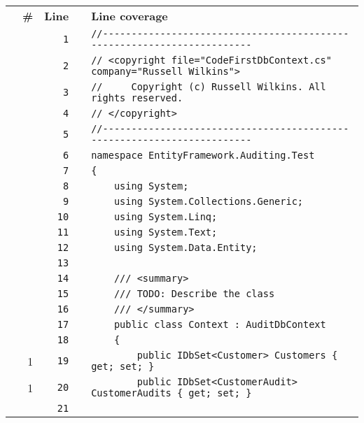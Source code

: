 \documentclass[a4paper,10pt]{article}
\begin{document}
\begin{longtable}[l]{lrrll}
\textbf{} & \textbf{\#} & \textbf{Line} & \textbf{} & \textbf{Line coverage}\\
\cellcolor{gray} &  & \verb~1~ & & \verb~//-----------------------------------------------------------------------~\\
\cellcolor{gray} &  & \verb~2~ & & \verb~// <copyright file="CodeFirstDbContext.cs" company="Russell Wilkins">~\\
\cellcolor{gray} &  & \verb~3~ & & \verb~//     Copyright (c) Russell Wilkins. All rights reserved.~\\
\cellcolor{gray} &  & \verb~4~ & & \verb~// </copyright>~\\
\cellcolor{gray} &  & \verb~5~ & & \verb~//-----------------------------------------------------------------------~\\
\cellcolor{gray} &  & \verb~6~ & & \verb~namespace EntityFramework.Auditing.Test~\\
\cellcolor{gray} &  & \verb~7~ & & \verb~{~\\
\cellcolor{gray} &  & \verb~8~ & & \verb~    using System;~\\
\cellcolor{gray} &  & \verb~9~ & & \verb~    using System.Collections.Generic;~\\
\cellcolor{gray} &  & \verb~10~ & & \verb~    using System.Linq;~\\
\cellcolor{gray} &  & \verb~11~ & & \verb~    using System.Text;~\\
\cellcolor{gray} &  & \verb~12~ & & \verb~    using System.Data.Entity;~\\
\cellcolor{gray} &  & \verb~13~ & & \verb~~\\
\cellcolor{gray} &  & \verb~14~ & & \verb~    /// <summary>~\\
\cellcolor{gray} &  & \verb~15~ & & \verb~    /// TODO: Describe the class~\\
\cellcolor{gray} &  & \verb~16~ & & \verb~    /// </summary>~\\
\cellcolor{gray} &  & \verb~17~ & & \verb~    public class Context : AuditDbContext~\\
\cellcolor{gray} &  & \verb~18~ & & \verb~    {~\\
\cellcolor{green} & 1 & \verb~19~ & & \verb~        public IDbSet<Customer> Customers { get; set; }~\\
\cellcolor{green} & 1 & \verb~20~ & & \verb~        public IDbSet<CustomerAudit> CustomerAudits { get; set; }~\\
\cellcolor{gray} &  & \verb~21~ & & \verb~~\\

\end{longtable}
\end{document}
